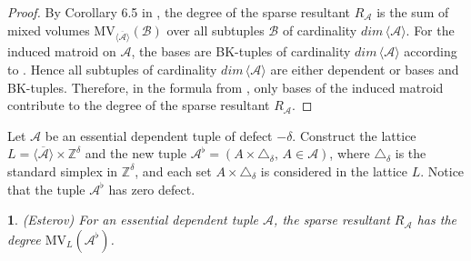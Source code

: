 \documentclass[11pt]{article}
\theoremstyle{plain}
\theoremstyle{definition}
\theoremstyle{remark}
\theoremstyle{plain}
\theoremstyle{plain}
\newtheorem{prop}[thm]{\protect\propositionname}
\theoremstyle{plain}
\theoremstyle{definition}
\providecommand{\propositionname}{Proposition}
\begin{document}
\begin{proof}
By Corollary 6.5 in \cite{dickenstein_tropical_2007}, the degree
of the sparse resultant $R_{\mathscr{A}}$ is the sum of mixed volumes
$\mathrm{MV}_{\overline{\langle\mathscr{A}\rangle}}(\mathscr{B})$
over all subtuples $\mathscr{B}$ of cardinality $dim\,\langle\mathscr{A}\rangle$.
For the induced matroid on $\mathscr{A}$, the bases are BK-tuples
of cardinality $dim\,\langle\mathscr{A}\rangle$ according to \cite{pokidkin_combinatorics_2025}.
Hence all subtuples of cardinality $dim\,\langle\mathscr{A}\rangle$
are either dependent or bases and BK-tuples. Therefore, in the formula
from \cite{dickenstein_tropical_2007}, only bases of the induced
matroid contribute to the degree of the sparse resultant $R_{\mathscr{A}}$.
\end{proof}
Let $\mathscr{A}$ be an essential dependent tuple of defect $-\delta$.
Construct the lattice $L=\overline{\langle\mathscr{A}\rangle}\times\mathbb{Z}^{\delta}$
and the new tuple $\mathscr{A}^{\flat}=(A\times\triangle_{\delta},\,A\in\mathscr{A})$,
where $\triangle_{\delta}$ is the standard simplex in $\mathbb{Z}^{\delta}$,
and each set $A\times\triangle_{\delta}$ is considered in the lattice
$L$. Notice that the tuple $\mathscr{A}^{\flat}$ has zero defect.
\begin{prop}
\textup{\label{Proposition. II Degree of the sparse resultant for a linearly dependent tuple}(Esterov)}
For an essential dependent tuple $\mathscr{A}$, the sparse resultant
$R_{\mathscr{A}}$ has the degree $\mathrm{MV}_{L}(\mathscr{A}^{\flat})$.
\end{prop}
\end{document}

